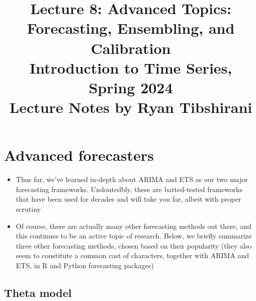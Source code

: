\documentclass{article}
\title{Lecture 8: Advanced Topics: Forecasting, Ensembling, and Calibration \\
  \smallskip  
\large Introduction to Time Series, Spring 2024 \\ \smallskip
Lecture Notes by Ryan Tibshirani}
\date{}
\begin{document}
\maketitle
\RaggedRight
\vspace{-50pt}

\section{Advanced forecasters}

\begin{itemize}
\item Thus far, we've learned in-depth about ARIMA and ETS as our two major 
  forecasting frameworks. Undoutedbly, these are batted-tested frameworks that 
  have been used for decades and will take you far, albeit with proper scrutiny 

\item Of course, there are actually many other forecasting methods out there,
  and this continues to be an active topic of research. Below, we briefly
  summarize three other forecasting methods, chosen based on their popularity
  (they also seem to constitute a common cast of characters, together with ARIMA
  and ETS, in R and Python forecasting packages)       
\end{itemize}

\subsection{Theta model}
\end{document}
